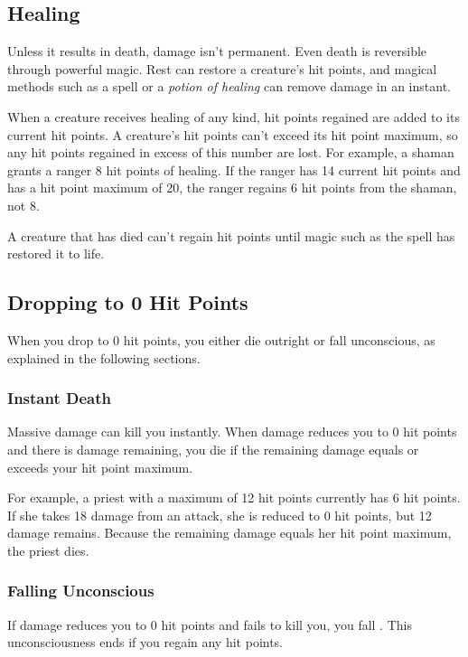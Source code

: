 \subsection{Healing}

Unless it results in death, damage isn't permanent. Even death is reversible through powerful magic. Rest can restore a creature's hit points, and magical methods such as a  spell or a \textit{potion of healing} can remove damage in an instant.

When a creature receives healing of any kind, hit points regained are added to its current hit points. A creature's hit points can't exceed its hit point maximum, so any hit points regained in excess of this number are lost. For example, a shaman grants a ranger 8 hit points of healing. If the ranger has 14 current hit points and has a hit point maximum of 20, the ranger regains 6 hit points from the shaman, not 8.

A creature that has died can't regain hit points until magic such as the  spell has restored it to life.

\subsection{Dropping to 0 Hit Points}

When you drop to 0 hit points, you either die outright or fall unconscious, as explained in the following sections.

\subsubsection{Instant Death}

Massive damage can kill you instantly. When damage reduces you to 0 hit points and there is damage remaining, you die if the remaining damage equals or exceeds your hit point maximum.

For example, a priest with a maximum of 12 hit points currently has 6 hit points. If she takes 18 damage from an attack, she is reduced to 0 hit points, but 12 damage remains. Because the remaining damage equals her hit point maximum, the priest dies.

\subsubsection{Falling Unconscious}

If damage reduces you to 0 hit points and fails to kill you, you fall . This unconsciousness ends if you regain any hit points.

